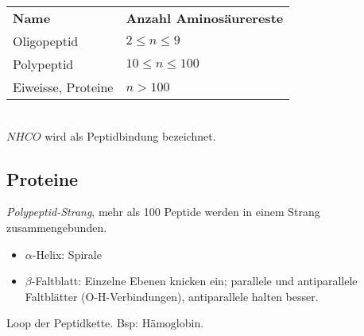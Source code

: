 \begin{center}
	\begin{tabular}{l l}
		\textbf{Name} & \textbf{Anzahl Aminosäurereste} \\
		Oligopeptid & $2 \leq n \leq 9$ \\
		Polypeptid & $10\leq n \leq 100$ \\
		Eiweisse, Proteine & $n>100$\\
	\end{tabular}
\end{center}



\chemsign{+}

\chemrel{->}
{\vspace{4em}\chemsign{+}}
\\

$NHCO$ wird als Peptidbindung bezeichnet.

\subsection{Proteine}

\begin{definition}[Primärstruktur]
	\textit{Polypeptid-Strang}, mehr als 100 Peptide werden in einem Strang zusammengebunden.
\end{definition}

\begin{definition}[Sekundärstruktur]
	\begin{itemize}
		\item $\alpha$-Helix: Spirale
		\item $\beta$-Faltblatt: Einzelne Ebenen knicken ein; parallele und antiparallele Faltblätter (O-H-Verbindungen), antiparallele halten besser.
	\end{itemize}
\end{definition}

\begin{definition}[Tertiärstruktur]
	Loop der Peptidkette. Bsp: Hämoglobin.
\end{definition}








